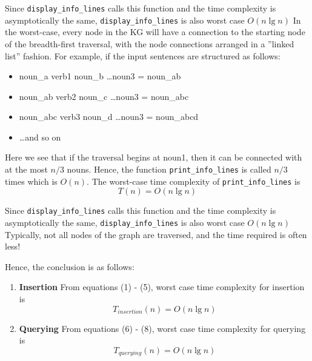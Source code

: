 \documentclass[conference]{IEEEtran}
\begin{document}
\begin{enumerate}
\begin{itemize}
Since \texttt{display\_info\_lines} calls this function
and the time complexity is asymptotically the same,
\texttt{display\_info\_lines} is also worst case $O(n \lg n)$
In the worst-case, every node in the KG will have a
connection to the starting node of the breadth-first traversal,
with the node connections arranged in a ”linked list” fashion.
For example, if the input sentences are structured as follows:
\begin{itemize}
    \item noun\_a   verb1 noun\_b   \ldots noun3 = noun\_ab
    \item noun\_ab  verb2 noun\_c   \ldots noun3 = noun\_abc
    \item noun\_abc verb3 noun\_d   \ldots noun3 = noun\_abcd
    \item \ldots and so on
\end{itemize}
Here we see that if the traversal begins at noun1, then it can
be connected with at the most $n/3$ nouns. Hence, the function
\texttt{print\_info\_lines} is called $n/3$ times which is $O(n)$.
The worst-case time complexity of \texttt{print\_info\_lines} is
\begin{equation}
    T(n) = O(n\lg n)
\end{equation}
\end{itemize}
\end{enumerate}
Since \texttt{display\_info\_lines} calls this function and the time complexity is asymptotically the same, \texttt{display\_info\_lines} is also worst case $O(n \lg n)$
Typically, not all nodes of the graph are traversed, and the
time required is often less!

Hence, the conclusion is as follows:
\begin{enumerate}
    \item \textbf{Insertion} From equations (1) - (5), worst case time complexity for insertion is 
    \begin{equation*}
        T_{insertion}(n) = O(n\lg n) 
    \end{equation*}

    \item \textbf{Querying} From equations (6) - (8), worst case time complexity for querying is 
    \begin{equation*}
        T_{querying}(n) = O(n\lg n) 
    \end{equation*}
\end{enumerate}
\end{document}
